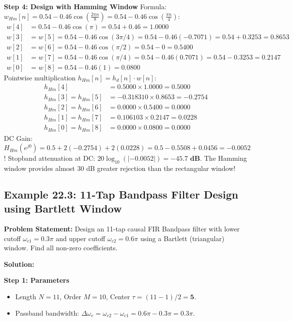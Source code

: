 \documentclass[11pt,a4paper]{article}
\begin{document}
\vspace{1mm}
\noindent\textbf{Step 4: Design with Hamming Window}
Formula: $w_{Hm}[n] = 0.54 - 0.46\cos\left( \frac{2\pi n}{8} \right) = 0.54 - 0.46\cos\left( \frac{\pi n}{4} \right)$:
\begin{align}
w[4] &= 0.54 - 0.46\cos(\pi) = 0.54 + 0.46 = 1.0000 \\
w[3] &= w[5] = 0.54 - 0.46\cos(3\pi/4) = 0.54 - 0.46(-0.7071) = 0.54 + 0.3253 = 0.8653 \\
w[2] &= w[6] = 0.54 - 0.46\cos(\pi/2) = 0.54 - 0 = 0.5400 \\
w[1] &= w[7] = 0.54 - 0.46\cos(\pi/4) = 0.54 - 0.46(0.7071) = 0.54 - 0.3253 = 0.2147 \\
w[0] &= w[8] = 0.54 - 0.46(1) = 0.0800
\end{align}
Pointwise multiplication $h_{Hm}[n] = h_d[n] \cdot w[n]$:
\begin{align}
h_{Hm}[4] &= 0.5000 \times 1.0000 = \mathbf{0.5000} \\
h_{Hm}[3] = h_{Hm}[5] &= -0.318310 \times 0.8653 = \mathbf{-0.2754} \\
h_{Hm}[2] = h_{Hm}[6] &= 0.0000 \times 0.5400 = \mathbf{0.0000} \\
h_{Hm}[1] = h_{Hm}[7] &= 0.106103 \times 0.2147 = \mathbf{0.0228} \\
h_{Hm}[0] = h_{Hm}[8] &= 0.0000 \times 0.0800 = \mathbf{0.0000}
\end{align}
DC Gain: $H_{Hm}(e^{j0}) = 0.5 + 2(-0.2754) + 2(0.0228) = 0.5 - 0.5508 + 0.0456 = \mathbf{-0.0052}$!
Stopband attenuation at DC: $20\log_{10}(|-0.0052|) = \mathbf{-45.7 \text{ dB}}$. The Hamming window provides almost $30$ dB greater rejection than the rectangular window!

\subsection{Example 22.3: 11-Tap Bandpass Filter Design using Bartlett Window}
\textbf{Problem Statement:} Design an 11-tap causal FIR Bandpass filter with lower cutoff $\omega_{c1} = 0.3\pi$ and upper cutoff $\omega_{c2} = 0.6\pi$ using a Bartlett (triangular) window. Find all non-zero coefficients.

\vspace{1mm}
\noindent\textbf{Solution:}

\noindent\textbf{Step 1: Parameters}
\begin{itemize}
    \item Length $N = 11$, Order $M = 10$, Center $\tau = (11-1)/2 = \mathbf{5}$.
    \item Passband bandwidth: $\Delta\omega_c = \omega_{c2} - \omega_{c1} = 0.6\pi - 0.3\pi = 0.3\pi$.
\end{itemize}
\end{document}

